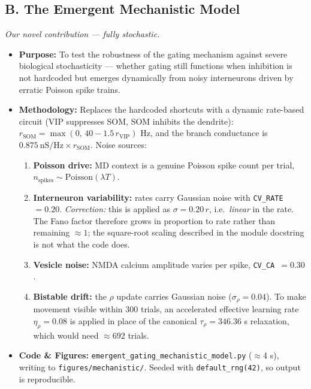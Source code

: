 \documentclass[11pt,a4paper]{article}
\begin{document}
\subsection{B. The Emergent Mechanistic Model}
\textit{Our novel contribution --- fully stochastic.}

\begin{itemize}
    \item \textbf{Purpose:} To test the robustness of the gating mechanism against
      severe biological stochasticity --- whether gating still functions when
      inhibition is not hardcoded but emerges dynamically from noisy interneurons
      driven by erratic Poisson spike trains.
    \item \textbf{Methodology:} Replaces the hardcoded shortcuts with a dynamic
      rate-based circuit (VIP suppresses SOM, SOM inhibits the dendrite):
      $r_{\text{SOM}} = \max(0,\, 40 - 1.5\,r_{\text{VIP}})$ Hz, and the branch
      conductance is $0.875\ \text{nS/Hz} \times r_{\text{SOM}}$. Noise sources:
        \begin{enumerate}
            \item \textbf{Poisson drive:} MD context is a genuine Poisson spike count
              per trial, $n_{\text{spikes}} \sim \text{Poisson}(\lambda T)$.
            \item \textbf{Interneuron variability:} rates carry Gaussian noise with
              \texttt{CV\_RATE}~$=0.20$. \emph{Correction:} this is applied as
              $\sigma = 0.20\,r$, i.e.\ \emph{linear} in the rate. The Fano factor
              therefore grows in proportion to rate rather than remaining $\approx 1$;
              the square-root scaling described in the module docstring is not what the
              code does.
            \item \textbf{Vesicle noise:} NMDA calcium amplitude varies per spike,
              \texttt{CV\_CA}~$=0.30$.
            \item \textbf{Bistable drift:} the $\rho$ update carries Gaussian noise
              ($\sigma_\rho = 0.04$). To make movement visible within 300 trials, an
              accelerated effective learning rate $\eta_\rho = 0.08$ is applied in
              place of the canonical $\tau_\rho = 346.36$ s relaxation, which would
              need $\approx 692$ trials.
        \end{enumerate}
    \item \textbf{Code \& Figures:} \texttt{emergent\_gating\_mechanistic\_model.py}
      ($\approx$4 s), writing to \texttt{figures/mechanistic/}. Seeded with
      \texttt{default\_rng(42)}, so output is reproducible.
\end{itemize}
\end{document}
